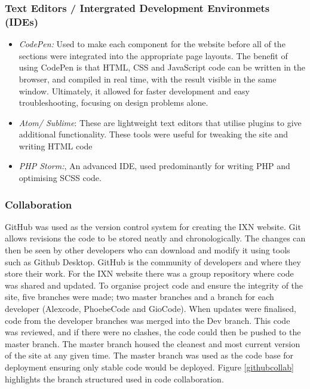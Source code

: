 \documentclass[fontsize=11pt]{extarticle}
\numberwithin{figure}{section} %
\providecommand{\tightlist}{%
  \setlength{\itemsep}{0pt}\setlength{\parskip}{0pt}}
\begin{document}
\hypertarget{text-editors-intergrated-development-environmets-ides}{%
\subsubsection{Text Editors / Intergrated Development Environmets
(IDEs)}\label{text-editors-intergrated-development-environmets-ides}}

\begin{itemize}
\tightlist
\item
  \emph{CodePen:} Used to make each component for the website before all
  of the sections were integrated into the appropriate page layouts. The
  benefit of using CodePen is that HTML, CSS and JavaScript code can be
  written in the browser, and compiled in real time, with the result
  visible in the same window. \cite{p19} Ultimately, it allowed for
  faster development and easy troubleshooting, focusing on design
  problems alone.
\item
  \emph{Atom/ Sublime}: These are lightweight text editors that utilise
  plugins to give additional functionality. These tools were useful for
  tweaking the site and writing HTML code
\item
  \emph{PHP Storm:}, An advanced IDE, used predominantly for writing PHP
  and optimising SCSS code.
\end{itemize}

\hypertarget{collaboration}{%
\subsubsection{Collaboration}\label{collaboration}}

GitHub was used as the version control system for creating the IXN
website. Git allows revisions the code to be stored neatly and
chronologically. The changes can then be seen by other developers who
can download and modify it using tools such as Github Desktop.
\cite{p20} GitHub is the community of developers and where they store
their work. For the IXN website there was a group repository where code
was shared and updated. To organise project code and ensure the
integrity of the site, five branches were made; two master branches and
a branch for each developer (Alexcode, PhoebeCode and GioCode). When
updates were finalised, code from the developer branches was merged into
the Dev branch. This code was reviewed, and if there were no clashes,
the code could then be pushed to the master branch. The master branch
housed the cleanest and most current version of the site at any given
time. The master branch was used as the code base for deployment
ensuring only stable code would be deployed. Figure \ref{githubcollab}
highlights the branch structured used in code collaboration.
\end{document}
